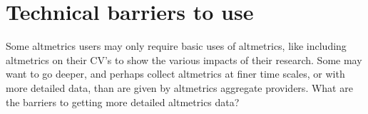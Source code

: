 \documentclass[letterpaper,superscriptaddress,showkeys,longbibliography]{revtex4-1}\usepackage{graphicx, color}
\begin{document}


\section*{Technical barriers to use}

Some altmetrics users may only require basic uses of altmetrics, like including altmetrics on their CV's \cite{piwowar2013power} to show the various impacts of their research. Some may want to go deeper, and perhaps collect altmetrics at finer time scales, or with more detailed data, than are given by altmetrics aggregate providers. What are the barriers to getting more detailed altmetrics data? 
\end{document}
